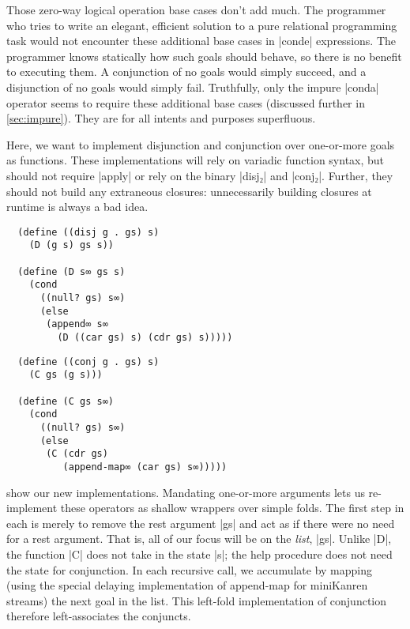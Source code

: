 \documentclass[sigplan,draft,natbib=false]{acmart}
\begin{document}
Those zero-way logical operation base cases don't add much. The
programmer who tries to write an elegant, efficient solution to a pure
relational programming task would not encounter these additional base
cases in \rackinline|conde| expressions. The programmer knows
statically how such goals should behave, so there is no benefit to
executing them. A conjunction of no goals would simply succeed, and a
disjunction of no goals would simply fail. Truthfully, only the impure
\rackinline|conda| operator seems to require these additional base
cases (discussed further in \cref{sec:impure}). They are for all
intents and purposes superfluous.

Here, we want to implement disjunction and conjunction over
one-or-more goals as functions. These implementations will rely on
variadic function syntax, but should not require \rackinline|apply| or
rely on the binary \rackinline|disj₂| and \rackinline|conj₂|. Further,
they should not build any extraneous closures: unnecessarily building
closures at runtime is always a bad idea.

\begin{listing}
  \begin{verbatim}
  (define ((disj g . gs) s)
    (D (g s) gs s))

  (define (D s∞ gs s)
    (cond
      ((null? gs) s∞)
      (else
       (append∞ s∞
         (D ((car gs) s) (cdr gs) s)))))
  \end{verbatim}
  \caption{Eventual redefinition of \rackinline|disj|}
  \label{mnt:disj-reimplementation}
\end{listing}

\begin{listing}
  \begin{verbatim}
  (define ((conj g . gs) s)
    (C gs (g s)))

  (define (C gs s∞)
    (cond
      ((null? gs) s∞)
      (else
       (C (cdr gs)
          (append-map∞ (car gs) s∞)))))
  \end{verbatim}
  \caption{Eventual redefinition of \rackinline|conj|}
  \label{mnt:conj-reimplementation}
\end{listing}

 show our
new implementations. Mandating one-or-more arguments lets us
re-implement these operators as shallow wrappers over simple folds.
The first step in each is merely to remove the rest argument
\rackinline|gs| and act as if there were no need for a rest argument.
That is, all of our focus will be on the \emph{list}, \rackinline|gs|.
Unlike \rackinline|D|, the function \rackinline|C| does not take in
the state \rackinline|s|; the help procedure does not need the state
for conjunction. In each recursive call, we accumulate by mapping
(using the special delaying implementation of append-map for
miniKanren streams) the next goal in the list. This left-fold
implementation of conjunction therefore left-associates the conjuncts.
\end{document}
